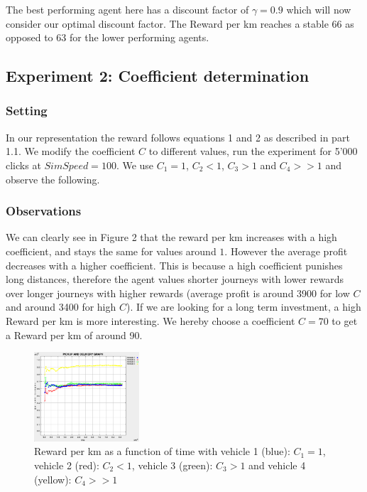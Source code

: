 \documentclass[11pt]{article}
\begin{document}
\indent \indent The best performing agent here has a discount factor of $\gamma = 0.9$ which will now consider our optimal discount factor. The Reward per km reaches a stable 66 as opposed to 63 for the lower performing agents.

\subsection{Experiment 2: Coefficient determination}

\subsubsection{Setting}

\indent \indent In our representation the reward follows equations 1 and 2 as described in part 1.1. We modify the coefficient $C$ to different values, run the experiment for 5'000 clicks at $SimSpeed = 100$. We use $C_1 = 1$, $C_2 < 1$, $C_3 > 1$ and $C_4 >> 1$ and observe the following.

\subsubsection{Observations}

\indent \indent We can clearly see in Figure 2 that the reward per km increases with a high coefficient, and stays the same for values around $1$. However the average profit decreases with a higher coefficient. This is because a high coefficient punishes long distances, therefore the agent values shorter journeys with lower rewards over longer journeys with higher rewards (average profit is around 3900 for low $C$ and around 3400 for high $C$). If we are looking for a long term investment, a high Reward per km is more interesting. We hereby choose a coefficient $C=70$ to get a Reward per km of around 90.

\begin{figure}[h]
    \centering
    \includegraphics[width=0.35\textwidth, frame]{Fig2.png}
    \caption{Reward per km as a function of time with vehicle 1 (blue): $C_1 = 1$, vehicle 2 (red): $C_2 < 1$, vehicle 3 (green): $C_3 > 1$ and vehicle 4 (yellow): $C_4 >> 1$}
    \label{fig:1}
\end{figure}
\end{document}

